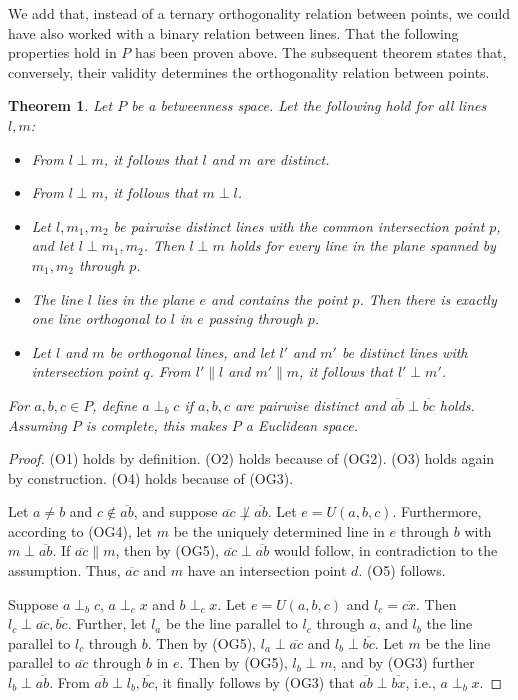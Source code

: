 \documentclass[11pt,a4paper]{article}
\newcommand{\ortho}[3]{#1 \perp_{#2} #3}
\newcommand{\lineab}[1]{\overline{#1}}
\newtheorem{theorem}{Theorem}[section]
\begin{document}
We add that, instead of a ternary orthogonality relation between points, we could have also worked with a binary relation between lines. That the following properties hold in $P$ has been proven above. The subsequent theorem states that, conversely, their validity determines the orthogonality relation between points.

\begin{theorem} \label{thm:alternative_ortho}
Let $P$ be a betweenness space. Let the following hold for all lines $l, m$:
\begin{itemize}
    \item[(OG1)] From $l \perp m$, it follows that $l$ and $m$ are distinct.
    \item[(OG2)] From $l \perp m$, it follows that $m \perp l$.
    \item[(OG3)] Let $l, m_1, m_2$ be pairwise distinct lines with the common intersection point $p$, and let $l \perp m_1, m_2$. Then $l \perp m$ holds for every line in the plane spanned by $m_1, m_2$ through $p$.
    \item[(OG4)] The line $l$ lies in the plane $e$ and contains the point $p$. Then there is exactly one line orthogonal to $l$ in $e$ passing through $p$.
    \item[(OG5)] Let $l$ and $m$ be orthogonal lines, and let $l'$ and $m'$ be distinct lines with intersection point $q$. From $l' \parallel l$ and $m' \parallel m$, it follows that $l' \perp m'$.
\end{itemize}
For $a, b, c \in P$, define $\ortho{a}{b}{c}$ if $a, b, c$ are pairwise distinct and $\lineab{ab} \perp \lineab{bc}$ holds. Assuming $P$ is complete, this makes $P$ a Euclidean space.
\end{theorem}

\begin{proof}
(O1) holds by definition. (O2) holds because of (OG2). (O3) holds again by construction. (O4) holds because of (OG3).

Let $a \neq b$ and $c \notin \lineab{ab}$, and suppose $\lineab{ac} \not\perp \lineab{ab}$. Let $e = U(a, b, c)$. Furthermore, according to (OG4), let $m$ be the uniquely determined line in $e$ through $b$ with $m \perp \lineab{ab}$. If $\lineab{ac} \parallel m$, then by (OG5), $\lineab{ac} \perp \lineab{ab}$ would follow, in contradiction to the assumption. Thus, $\lineab{ac}$ and $m$ have an intersection point $d$. (O5) follows.

Suppose $\ortho{a}{b}{c}$, $\ortho{a}{c}{x}$ and $\ortho{b}{c}{x}$. Let $e = U(a, b, c)$ and $l_c = \lineab{cx}$. Then $l_c \perp \lineab{ac}, \lineab{bc}$. Further, let $l_a$ be the line parallel to $l_c$ through $a$, and $l_b$ the line parallel to $l_c$ through $b$. Then by (OG5), $l_a \perp \lineab{ac}$ and $l_b \perp \lineab{bc}$. Let $m$ be the line parallel to $\lineab{ac}$ through $b$ in $e$. Then by (OG5), $l_b \perp m$, and by (OG3) further $l_b \perp \lineab{ab}$. From $\lineab{ab} \perp l_b, \lineab{bc}$, it finally follows by (OG3) that $\lineab{ab} \perp \lineab{bx}$, i.e., $\ortho{a}{b}{x}$.
\end{proof}
\end{document}
